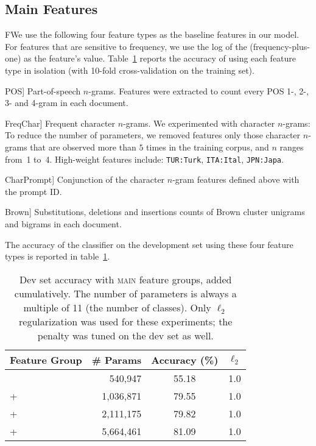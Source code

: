 \documentclass[11pt,letterpaper]{article}
\newcommand{\ignore}[1]{}
\newcommand{\tref}[1]{table~\ref{#1}}
\newcommand{\Tref}[1]{Table~\ref{#1}}
\newcommand{\feat}[1]{\textsmaller[.5]{\textsf{#1}}} %
\begin{document}
\subsection{Main Features}
\label{sec:mainfeats}
FWe use the following four feature types as the baseline features in our
model.  For features that are sensitive to frequency, we use the log of the (frequency-plus-one) as
the feature's value.  \Tref{tbl:mainfeats} reports the accuracy of using each feature type in
isolation (with 10-fold cross-validation on the training set).


\begin{compactdesc}
\item[\feat{POS}] Part-of-speech $n$-grams.  Features were extracted
  to count every POS 1-, 2-, 3- and 4-gram in each
  document. \ignore{CHI:IN PRP VBD, ARA:NN VBZ, KOR:DT JJ} 
\item[\feat{FreqChar}] Frequent character $n$-grams.  We experimented
  with character $n$-grams: To reduce the number of parameters, we removed features
  only those character $n$-grams that are observed more
  than $5$ times in the training corpus, and $n$ ranges from~1
    to~4. High-weight features include: {\tt TUR:Turk}, {\tt ITA:Ital}, {\tt JPN:Japa}.
\item[\feat{CharPrompt}] Conjunction of the character $n$-gram
  features defined above with the prompt ID.
\item[\feat{Brown}] Substitutions, deletions and insertions counts of Brown cluster 
unigrams and bigrams in each document.\ignore{in top-30 features Brown features occur up to 5 times in 10 out of 11 L1s (all except Arabic)} 
\end{compactdesc}
\noindent
The accuracy of the classifier on the development set using these four
feature types is reported in \tref{tbl:mainfeats}.

\begin{table}[hbt]
\small\centering
\begin{tabular}{lrcc}
\textbf{Feature Group} & \multicolumn{1}{c}{\textbf{\# Params}} & \textbf{Accuracy (\%)} & \textbf{$\ell_2$} \\
\hline
\feat{POS} & 540,947 & 55.18 & 1.0 \\
+ \feat{FreqChar} & 1,036,871 & 79.55 & 1.0 \\ 
\quad + \feat{CharPrompt} & 2,111,175 & 79.82 & 1.0 \\ 
\qquad + \feat{Brown} & 5,664,461 & 81.09 & 1.0 \\
\end{tabular}
\caption{Dev set accuracy with \textsc{main} feature groups, added cumulatively. 
  The number of parameters is always a multiple of 11 (the number of classes). 
  Only $\ell_2$ regularization was used for these experiments; 
  the penalty was tuned on the dev set as well.}
\label{tbl:mainfeats}
\end{table}
\end{document}
